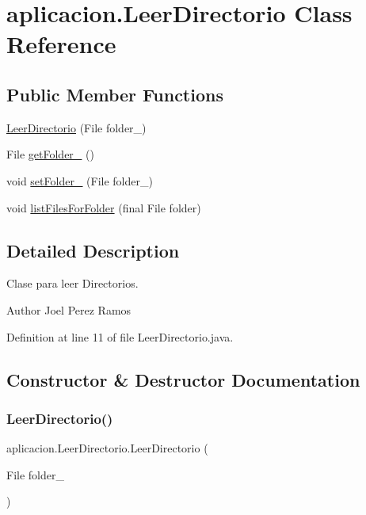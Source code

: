\hypertarget{classaplicacion_1_1_leer_directorio}{}\section{aplicacion.\+Leer\+Directorio Class Reference}
\label{classaplicacion_1_1_leer_directorio}
\subsection*{Public Member Functions}
\begin{DoxyCompactItemize}
\item 
\hyperlink{classaplicacion_1_1_leer_directorio_a02169b5b69017ed66a63b94f9bd7a2ad}{Leer\+Directorio} (File folder\+\_\+)
\item 
File \hyperlink{classaplicacion_1_1_leer_directorio_aa9db3677912609ea74f9b21c654c6ad8}{get\+Folder\+\_\+} ()
\item 
void \hyperlink{classaplicacion_1_1_leer_directorio_a42152251cb0eaf44b59e8ea92ebcc165}{set\+Folder\+\_\+} (File folder\+\_\+)
\item 
void \hyperlink{classaplicacion_1_1_leer_directorio_a59321b6374b5ef72ac862f6b283399c9}{list\+Files\+For\+Folder} (final File folder)
\end{DoxyCompactItemize}


\subsection{Detailed Description}
Clase para leer Directorios. \begin{DoxyAuthor}{Author}
Joel Perez Ramos 
\end{DoxyAuthor}


Definition at line 11 of file Leer\+Directorio.\+java.



\subsection{Constructor \& Destructor Documentation}
\hypertarget{classaplicacion_1_1_leer_directorio_a02169b5b69017ed66a63b94f9bd7a2ad}{}\label{classaplicacion_1_1_leer_directorio_a02169b5b69017ed66a63b94f9bd7a2ad} 
\subsubsection{\texorpdfstring{Leer\+Directorio()}{LeerDirectorio()}}
{\footnotesize\ttfamily aplicacion.\+Leer\+Directorio.\+Leer\+Directorio (\begin{DoxyParamCaption}\item[{File}]{folder\+\_\+ }\end{DoxyParamCaption})}

